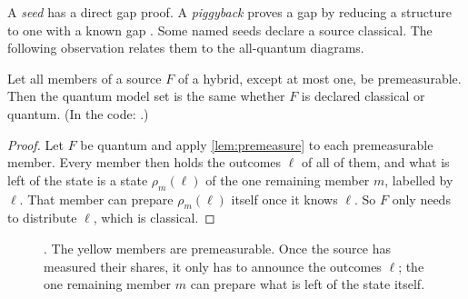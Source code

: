 A \emph{seed} has a direct gap proof. A \emph{piggyback} proves a gap by reducing a structure to one
with a known gap \cite{Repo}. Some named seeds declare a source classical. The following observation
relates them to the all-quantum diagrams.

\begin{proposition}\label{prop:lift}
Let all members of a source $F$ of a hybrid, except at most one, be premeasurable. Then the quantum model set is
the same whether $F$ is declared classical or quantum. (In the code: .)
\end{proposition}
\begin{proof}
Let $F$ be quantum and apply \cref{lem:premeasure} to each premeasurable member. Every member then holds the
outcomes $\ell$ of all of them, and what is left of the state is a state $\rho_m(\ell)$ of the one remaining member
$m$, labelled by $\ell$. That member can prepare $\rho_m(\ell)$ itself once it knows $\ell$. So $F$ only needs to
distribute $\ell$, which is classical.
\end{proof}

\begin{figure}[H]
\centering
{}
\caption{. The yellow members are premeasurable. Once the source has measured their shares, it only
has to announce the outcomes $\ell$; the one remaining member $m$ can prepare what is left of the state itself.}
\label{fig:lift}
\end{figure}

